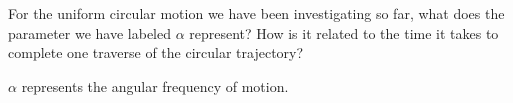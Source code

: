 For the uniform circular motion we have been investigating so far, what does the parameter we have labeled $\alpha$ represent? How is it related to the time it takes to complete one traverse of the circular trajectory?

\begin{solution}
    $\alpha$ represents the angular frequency of motion.
\end{solution}